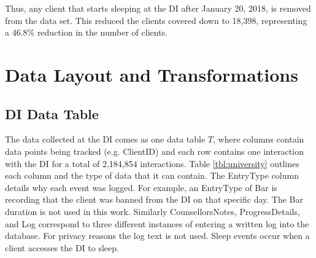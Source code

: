
Thus, any client that starts sleeping at the DI after January 20, 2018, is removed from the data set.
This reduced the clients covered down to 18,398, representing a 46.8\% reduction in the number of clients.



\section{Data Layout and Transformations} \label{chap:data:layout}


\subsection{DI Data Table}


The data collected at the DI comes as one data table $T$, where columns contain data points being tracked (e.g. ClientID) and each row contains one interaction with the DI for a total of 2,184,854 interactions. Table \ref{tbl:university} outlines each column and the type of data that it can contain. The EntryType column details why each event was logged. For example, an EntryType of Bar is recording that the client was banned from the DI on that specific day. The Bar duration is not used in this work. Similarly CounsellorsNotes, ProgressDetails, and Log correspond to three different instances of entering a written log into the database. For privacy reasons the log text is not used. Sleep events occur when a client accesses the DI to sleep.


